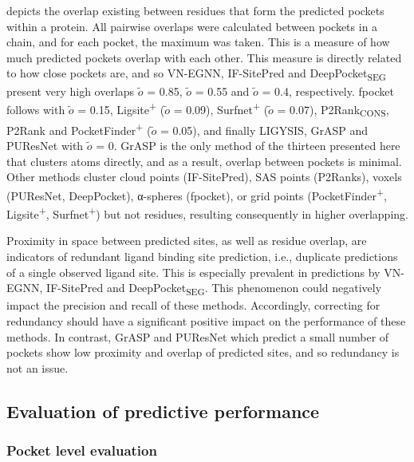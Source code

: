  depicts the overlap existing between residues that form the predicted pockets within a protein. All pairwise overlaps were calculated between pockets in a chain, and for each pocket, the maximum was taken. This is a measure of how much predicted pockets overlap with each other. This measure is directly related to how close pockets are, and so VN-EGNN, IF-SitePred and DeepPocket\textsubscript{SEG} present very high overlaps $\tilde{\textit{o}}$ = 0.85, $\tilde{\textit{o}}$ = 0.55 and $\tilde{\textit{o}}$ = 0.4, respectively. fpocket follows with $\tilde{\textit{o}}$ = 0.15, Ligsite\textsuperscript{+} ($\tilde{\textit{o}}$ = 0.09), Surfnet\textsuperscript{+} ($\tilde{\textit{o}}$ = 0.07), P2Rank\textsubscript{CONS}, P2Rank and PocketFinder\textsuperscript{+} ($\tilde{\textit{o}}$ = 0.05), and finally LIGYSIS, GrASP and PUResNet with $\tilde{\textit{o}}$ = 0. GrASP is the only method of the thirteen presented here that clusters atoms directly, and as a result, overlap between pockets is minimal. Other methods cluster cloud points (IF-SitePred), SAS points (P2Ranks), voxels (PUResNet, DeepPocket), α-spheres (fpocket), or grid points (PocketFinder\textsuperscript{+}, Ligsite\textsuperscript{+}, Surfnet\textsuperscript{+}) but not residues, resulting consequently in higher overlapping.

Proximity in space between predicted sites, as well as residue overlap, are indicators of redundant ligand binding site prediction, i.e., duplicate predictions of a single observed ligand site. This is especially prevalent in predictions by VN-EGNN, IF-SitePred and DeepPocket\textsubscript{SEG}. This phenomenon could negatively impact the precision and recall of these methods. Accordingly, correcting for redundancy should have a significant positive impact on the performance of these methods. In contrast, GrASP and PUResNet which predict a small number of pockets show low proximity and overlap of predicted sites, and so redundancy is not an issue.

\subsection{Evaluation of predictive performance}

\subsubsection{Pocket level evaluation}

